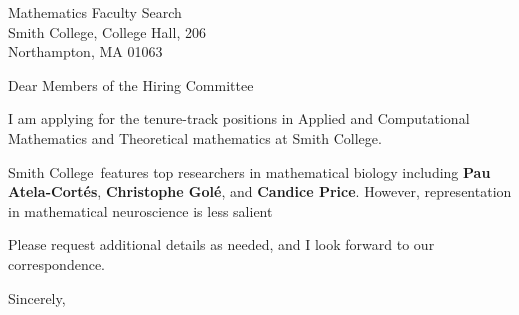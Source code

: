 




	
	
	\def\School{Smith College}
	
	\begin{letter}
		{Mathematics Faculty Search\\
			Smith College, College Hall, 206\\
			Northampton, MA 01063
		}
		
		\opening{Dear Members of the Hiring Committee}
		
		
		I am applying for the tenure-track positions in Applied and Computational Mathematics and Theoretical mathematics at \School. 
		
		
		
		\School~features top researchers in mathematical biology including \textbf{Pau Atela-Cortés}, \textbf{Christophe Golé}, and \textbf{Candice Price}. However, representation in mathematical neuroscience is less salient 
		
		
		
		
		
		Please request additional details as needed, and I look forward to our correspondence.
		
		\closing{Sincerely,}
	\end{letter}
